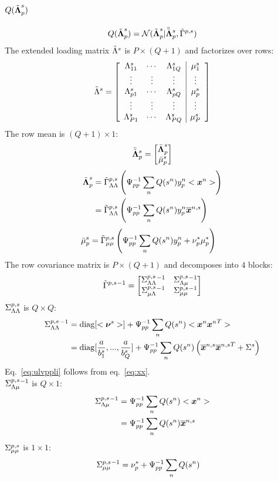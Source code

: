 \documentclass[a4paper]{article}
\begin{document}
\subsection{$Q(\tilde{\boldsymbol{\Lambda}}^s_p)$}
\begin{align}
  Q(\tilde{\boldsymbol{\Lambda}}^s_p)=\mathcal{N}(\tilde{\boldsymbol{\Lambda}}^s_p|\bar{\tilde{\boldsymbol{\Lambda}}}^s_p,\tilde{\Gamma}^{p,s})
\end{align}
The extended loading matrix $\tilde{\Lambda}^s$ is $P\times (Q+1)$ and factorizes over rows:
\begin{align}
  \tilde{\Lambda}^s=\left[
    \begin{array}{ccc|c}
      \Lambda^s_{11} & \cdots & \Lambda^s_{1Q} & \mu^s_1 \\
      \vdots & \vdots & \vdots & \vdots \\
      \Lambda^s_{p1} & \cdots & \Lambda^s_{pQ} & \mu^s_p \\
      \vdots & \vdots & \vdots & \vdots \\
      \Lambda^s_{P1} & \cdots & \Lambda^s_{PQ} & \mu^s_P
    \end{array}
  \right]
\end{align}
The row mean is $(Q+1)\times 1$:
\begin{align}
  \bar{\tilde{\boldsymbol{\Lambda}}}^s_p=\begin{bmatrix}
    \bar{\boldsymbol{\Lambda}}^s_p \\
    \bar{\mu}^s_p
  \end{bmatrix}
\end{align}
\begin{align}
  \bar{\boldsymbol{\Lambda}}^s_p
  &=\tilde{\Gamma}^{p,s}_{\Lambda\Lambda}\left(\Psi^{-1}_{pp}\sum_n Q(s^n)y^n_p<\boldsymbol{x}^n>\right) \\
  &=\tilde{\Gamma}^{p,s}_{\Lambda\Lambda}\left(\Psi^{-1}_{pp}\sum_n Q(s^n)y^n_p\overline{\boldsymbol{x}}^{n,s}\right)
\end{align}
\begin{align}
  \bar{\mu}^s_p
  &=\tilde{\Gamma}^{p,s}_{\mu\mu}\left(\Psi^{-1}_{pp}\sum_n Q(s^n)y^n_p+\nu^*_p\mu^*_p\right)
\end{align}
The row covariance matrix is $P\times(Q+1)$ and decomposes into $4$ blocks:
\begin{align}
  \tilde{\Gamma}^{p,s}{}^{-1}=\begin{bmatrix}
    \Sigma^{p,s}_{\Lambda\Lambda}{}^{-1} & \Sigma^{p,s}_{\Lambda\mu}{}^{-1} \\
    \Sigma^{p,s}_{\mu\Lambda}{}^{-1} & \Sigma^{p,s}_{\mu\mu}{}^{-1}
  \end{bmatrix}
\end{align}
$\Sigma^{p,s}_{\Lambda\Lambda}$ is $Q\times Q$:
\begin{align}
  \Sigma^{p,s}_{\Lambda\Lambda}{}^{-1}
  &=\operatorname{diag}[<\boldsymbol{\nu}^s>]+\Psi^{-1}_{pp}\sum_n Q(s^n)<\boldsymbol{x}^n{\boldsymbol{x}^n}^T> \\
  &=\operatorname{diag}[\frac{a}{b^s_1},...,\frac{a}{b^s_Q}]+\Psi^{-1}_{pp}\sum_n Q(s^n)\left(\overline{\boldsymbol{x}}^{n,s}{\overline{\boldsymbol{x}}^{n,s}}^T+\Sigma^s\right) \label{eq:ulvppli}
\end{align}
Eq.~\ref{eq:ulvppli} follows from eq.~\ref{eq:xx}. \\
$\Sigma^{p,s}_{\Lambda\mu}{}^{-1}$ is $Q\times 1$:
\begin{align}
  \Sigma^{p,s}_{\Lambda\mu}{}^{-1}
  &=\Psi^{-1}_{pp}\sum_n Q(s^n)<\boldsymbol{x}^n> \\
  &=\Psi^{-1}_{pp}\sum_n Q(s^n)\overline{\boldsymbol{x}}^{n,s}
\end{align}
$\Sigma^{p,s}_{\mu\mu}$ is $1\times 1$:
\begin{align}
  \Sigma^{p,s}_{\mu\mu}{}^{-1}&=
  \nu^*_p+\Psi^{-1}_{pp}\sum_n Q(s^n)
\end{align}
\end{document}
